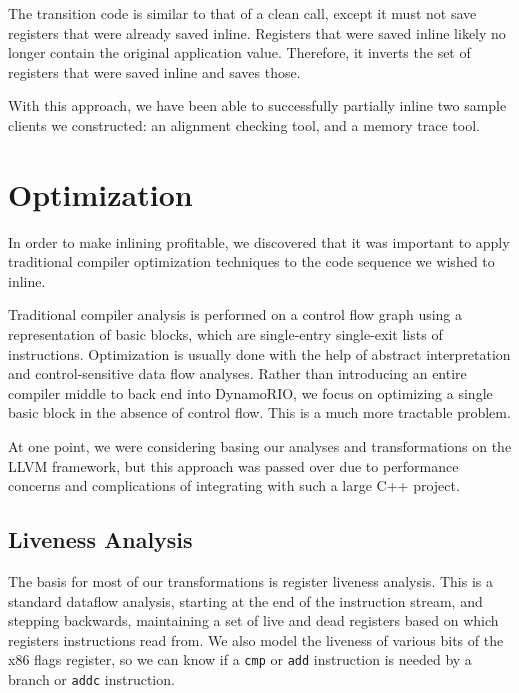 The transition code is similar to that of a clean call, except it must not save
registers that were already saved inline.  Registers that were saved inline
likely no longer contain the original application value.  Therefore, it inverts
the set of registers that were saved inline and saves those.

With this approach, we have been able to successfully partially inline two
sample clients we constructed: an alignment checking tool, and a memory trace
tool.


\section{Optimization}

In order to make inlining profitable, we discovered that it was important to
apply traditional compiler optimization techniques to the code sequence we
wished to inline.

Traditional compiler analysis is performed on a control flow graph using a
representation of basic blocks, which are single-entry single-exit lists of
instructions.  Optimization is usually done with the help of abstract
interpretation and control-sensitive data flow analyses.  Rather than
introducing an entire compiler middle to back end into DynamoRIO, we focus on
optimizing a single basic block in the absence of control flow.  This is a much
more tractable problem.

At one point, we were considering basing our analyses and transformations on the
LLVM\cite{llvm} framework, but this approach was passed over due to performance
concerns and complications of integrating with such a large C++ project.


\subsection{Liveness Analysis}
\label{sec:liveness}

The basis for most of our transformations is register liveness analysis.  This
is a standard dataflow analysis, starting at the end of the instruction stream,
and stepping backwards, maintaining a set of live and dead registers based on
which registers instructions read from.  We also model the liveness of various
bits of the x86 flags register, so we can know if a {\tt cmp} or {\tt add}
instruction is needed by a branch or {\tt addc} instruction.

